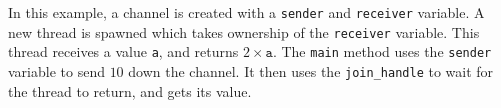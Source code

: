 In this example, a channel is created with a \texttt{sender} and \texttt{receiver} variable. A new thread is spawned which takes ownership of the \texttt{receiver} variable. This thread receives a value \texttt{a}, and returns $2\times\texttt{a}$. The \texttt{main} method uses the \texttt{sender} variable to send $10$ down the channel. It then uses the \texttt{join\_handle} to wait for the thread to return, and gets its value.

